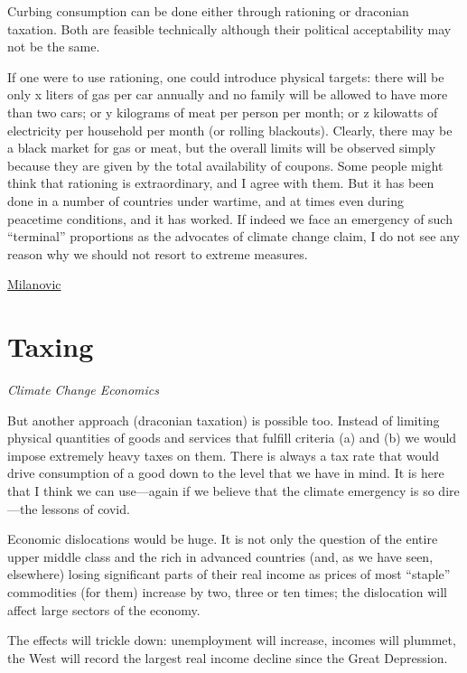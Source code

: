 \documentclass[
]{book}
\begin{document}
Curbing consumption can be done either through rationing or draconian taxation. Both are feasible technically although their political acceptability may not be the same.

If one were to use rationing, one could introduce physical targets: there will be only x liters of gas per car annually and no family will be allowed to have more than two cars; or y kilograms of meat per person per month; or z kilowatts of electricity per household per month (or rolling blackouts). Clearly, there may be a black market for gas or meat, but the overall limits will be observed simply because they are given by the total availability of coupons. Some people might think that rationing is extraordinary, and I agree with them. But it has been done in a number of countries under wartime, and at times even during peacetime conditions, and it has worked. If indeed we face an emergency of such ``terminal'' proportions as the advocates of climate change claim, I do not see any reason why we should not resort to extreme measures.

\href{http://glineq.blogspot.com/2021/02/climate-change-covid-and-global.html}{Milanovic}

\hypertarget{taxing}{%
\chapter{Taxing}\label{taxing}}

\emph{Climate Change Economics}

But another approach (draconian taxation) is possible too. Instead of limiting physical quantities of goods and services that fulfill criteria (a) and (b) we would impose extremely heavy taxes on them. There is always a tax rate that would drive consumption of a good down to the level that we have in mind. It is here that I think we can use---again if we believe that the climate emergency is so dire---the lessons of covid.

Economic dislocations would be huge. It is not only the question of the entire upper middle class and the rich in advanced countries (and, as we have seen, elsewhere) losing significant parts of their real income as prices of most ``staple'' commodities (for them) increase by two, three or ten times; the dislocation will affect large sectors of the economy.

The effects will trickle down: unemployment will increase, incomes will plummet, the West will record the largest real income decline since the Great Depression.
\end{document}
